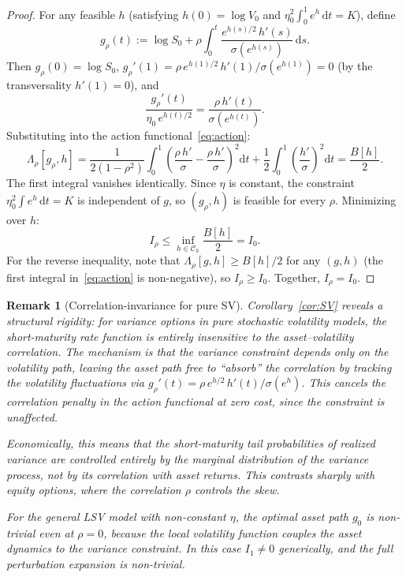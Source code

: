 \documentclass[11pt]{article}
\newtheorem{remark}[theorem]{Remark}
\theoremstyle{definition}
\newcommand{\dd}{\mathrm{d}}
\begin{document}
\begin{proof}
For any feasible $h$ (satisfying $h(0) = \log V_0$ and $\eta_0^2\int_0^1 e^{h}\,\dd t = K$), define
\begin{equation}\label{eq:g_star_rho}
  g_\rho(t) := \log S_0 + \rho\int_0^t \frac{e^{h(s)/2}\,h'(s)}{\sigma(e^{h(s)})}\,\dd s.
\end{equation}
Then $g_\rho(0) = \log S_0$, $g_\rho'(1) = \rho\,e^{h(1)/2}\,h'(1)/\sigma(e^{h(1)}) = 0$ (by the transversality $h'(1) = 0$), and
\begin{equation}
  \frac{g_\rho'(t)}{\eta_0\,e^{h(t)/2}} = \frac{\rho\,h'(t)}{\sigma(e^{h(t)})}.
\end{equation}
Substituting into the action functional~\eqref{eq:action}:
\begin{equation}
  \Lambda_\rho[g_\rho, h] = \frac{1}{2(1-\rho^2)}\int_0^1 \left(\frac{\rho\,h'}{\sigma} - \frac{\rho\,h'}{\sigma}\right)^{\!2}\dd t + \frac{1}{2}\int_0^1\!\left(\frac{h'}{\sigma}\right)^{\!2}\dd t = \frac{B[h]}{2}.
\end{equation}
The first integral vanishes identically. Since $\eta$ is constant, the constraint $\eta_0^2\int e^h\,\dd t = K$ is independent of $g$, so $(g_\rho, h)$ is feasible for every $\rho$. Minimizing over $h$:
\begin{equation}
  I_\rho \leq \inf_{h \in \mathcal{C}_h} \frac{B[h]}{2} = I_0.
\end{equation}
For the reverse inequality, note that $\Lambda_\rho[g,h] \geq B[h]/2$ for any $(g,h)$ (the first integral in~\eqref{eq:action} is non-negative), so $I_\rho \geq I_0$. Together, $I_\rho = I_0$.
\end{proof}

\begin{remark}[Correlation-invariance for pure SV]\label{rem:SV_insight}
Corollary~\ref{cor:SV} reveals a structural rigidity: for variance options in pure stochastic volatility models, the short-maturity rate function is entirely insensitive to the asset--volatility correlation. The mechanism is that the variance constraint depends only on the volatility path, leaving the asset path free to ``absorb'' the correlation by tracking the volatility fluctuations via $g_\rho'(t) = \rho\,e^{h/2}\,h'(t)/\sigma(e^h)$. This cancels the correlation penalty in the action functional at zero cost, since the constraint is unaffected.

Economically, this means that the short-maturity tail probabilities of realized variance are controlled entirely by the marginal distribution of the variance process, not by its correlation with asset returns. This contrasts sharply with equity options, where the correlation $\rho$ controls the skew.

For the general LSV model with non-constant $\eta$, the optimal asset path $g_0$ is non-trivial even at $\rho = 0$, because the local volatility function couples the asset dynamics to the variance constraint. In this case $I_1 \neq 0$ generically, and the full perturbation expansion is non-trivial.
\end{remark}
\end{document}
